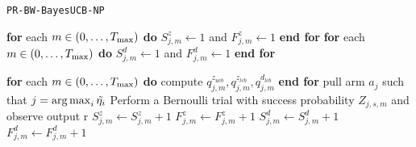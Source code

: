 \begin{algorithm}[H]
	\caption{\texttt{PR-BW-BayesUCB-NP}}
	\begin{scriptsize}
		\begin{algorithmic}[1]
			
			
			
			
			
			
			 
			\State \textbf{for} each $m \in (0,\dots,T_{\textnormal{max}})$ \textbf{do} $S_{j,m}^z \gets 1$ and $F_{j,m}^z \gets 1$ \textbf{end for}
			\State \textbf{for} each $m \in (0,\dots,T_{\textnormal{max}})$ \textbf{do} $S_{j,m}^d \gets 1$ and $F_{j,m}^d \gets 1$ \textbf{end for}
			\EndFor
			
			  
			\State \textbf{for} each $m \in (0,\dots,T_{\textnormal{max}})$ \textbf{do} compute $q_{j,m}^{z_{ucb}}, q_{j,m}^{z_{lcb}}, q_{j,m}^{d_{lcb}}$ \textbf{end for}
			\EndFor
			\State pull arm $a_j$ such that $j = \operatorname*{arg\,max}_i  \tilde{\eta_i}$
			 
			\State Perform a Bernoulli trial with success probability $Z_{j,s,m}$ and observe output r
			 \;
			\State $S_{j,m}^z \gets S_{j,m}^z + 1$ \;			
			\Else
			\State $F_{j,m}^z \gets F_{j,m}^z + 1$ \;			
			\EndIf
			\State $S_{j,m}^d \gets S_{j,m}^d + 1$ \;			
			\Else
			\State $F_{j,m}^d \gets F_{j,m}^d + 1$ \;			
			\EndIf
			
				
			
	
			\EndFor
			\EndFor
			
			
			\EndFunction
			
		\end{algorithmic}
	\end{scriptsize}
	\label{alg:BayesNP}
\end{algorithm}


























































